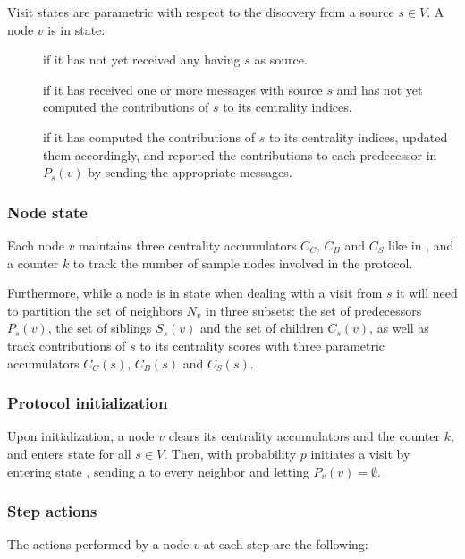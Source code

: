 Visit states are parametric with respect to the discovery from a source $s \in V$. A node $v$ is in state:
\begin{description}
\item[] if it has not yet received any \mdisc{} having $s$ as source.
\item[] if it has received one or more \mdisc{} messages with source $s$ and has not yet computed the contributions of $s$ to its centrality indices.
\item[] if it has computed the contributions of $s$ to its centrality indices, updated them accordingly, and reported the contributions to each predecessor in $P_s(v)$ by sending the appropriate \mrep{} messages.
\end{description}

\subsubsection{Node state}
Each node $v$ maintains three centrality accumulators $C_C$, $C_B$ and $C_S$ like in \deccen{}, and a counter $k$ to track the number of sample nodes involved in the protocol.

Furthermore, while a node is in state  when dealing with a visit from $s$ it will need to partition the set of neighbors $N_v$ in three subsets: the set of predecessors $P_s(v)$, the set of siblings $S_s(v)$ and the set of children $C_s(v)$, as well as track contributions of $s$ to its centrality scores with three parametric accumulators $C_C(s)$, $C_B(s)$ and $C_S(s)$.

\subsubsection{Protocol initialization}
Upon initialization, a node $v$ clears its centrality accumulators and the counter $k$, and enters state  for all $s \in V$. Then, with probability $p$ initiates a visit by entering state , sending a  to every neighbor and letting $P_v(v) = \emptyset$.

\subsubsection{Step actions}
The actions performed by a node $v$ at each step are the following:

